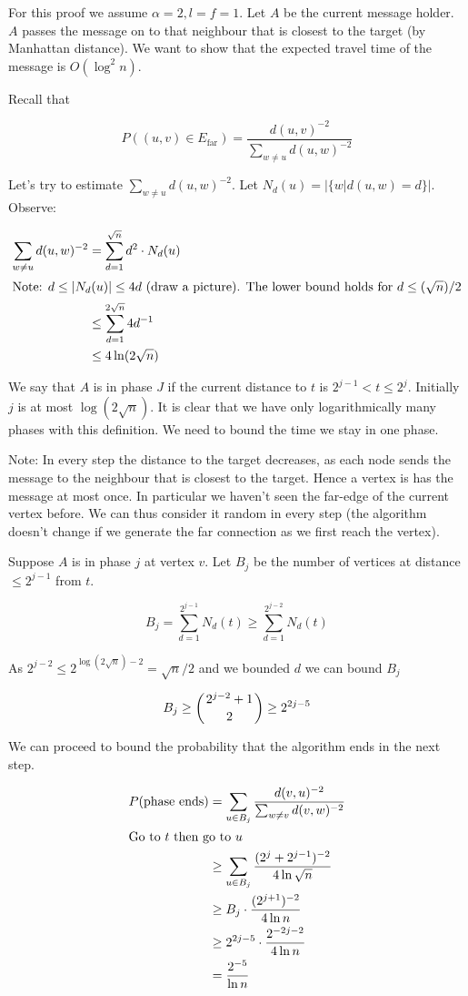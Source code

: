 \begin{pr} For this proof we assume $\alpha=2,l=f=1$. Let $A$ be the current message holder. $A$ passes the message on to that neighbour that is closest to the target (by Manhattan distance). We want to show that the expected travel time of the message is $O(\log^2n)$.

Recall that 

\[P((u,v)\in E_{\text{far}}) = \frac{d(u,v)^{-2}}{\sum_{w\neq u}d(u,w)^{-2}}\]

Let's try to estimate $\sum_{w\neq u}d(u,w)^{-2}$. Let $N_d(u) = |\{w|d(u,w)=d\}|$. Observe:

\begin{align*}
\sum_{w\neq u}d(u,w)^{-2} &= \sum_{d=1}^{\sqrt n} d^2\cdot N_d(u)\\
\intertext{Note: $d\leq |N_d(u)|\leq 4d$ (draw a picture). The lower bound holds for $d\leq (\sqrt n) /2$}
	&\leq \sum_{d=1}^{2\sqrt n} 4 d^{-1}\\
	&\leq 4 \ln(2\sqrt{n})
\end{align*}

We say that $A$ is in phase $J$ if the current distance to $t$ is $2^{j-1} < t \leq 2^j$. Initially $j$ is at most $\log (2\sqrt n)$. It is clear that we have only logarithmically many phases with this definition. We need to bound the time we stay in one phase.

Note: In every step the distance to the target decreases, as each node sends the message to the neighbour that is closest to the target. Hence a vertex is has the message at most once. In particular we haven't seen the far-edge of the current vertex before. We can thus consider it random in every step (the algorithm doesn't change if we generate the far connection as we first reach the vertex).

Suppose $A$ is in phase $j$ at vertex $v$. Let $B_j$ be the number of vertices at distance $\leq 2^{j-1}$ from $t$. 

\[B_j = \sum_{d=1}^{2^{j-1}} N_d(t)\geq \sum_{d=1}^{2^{j-2}} N_d(t)\]

As $2^{j-2} \leq 2^{\log(2\sqrt{n})-2} = \sqrt{n}/2$ and we bounded $d$ we can bound $B_j$

\[B_j \geq \left( {2^{j-2}+1} \atop 2 \right) \geq 2^{2j-5}\]

We can proceed to bound the probability that the algorithm ends in the next step.

\begin{align*}
P(\text{phase ends}) &= \sum_{u\in B_j} \frac{d(v,u)^{-2}}{\sum_{w\neq v} d(v,w)^{-2}}\\
\intertext{Go to $t$ then go to $u$}
&\geq \sum_{u\in B_j} \frac{(2^j+2^{j-1})^{-2}}{4\ln \sqrt{n}}\\
&\geq B_j \cdot \frac{(2^{j+1})^{-2}}{4\ln n}\\
&\geq 2^{2j-5} \cdot \frac{2^{-2j-2}}{4\ln n}\\
&=\frac{2^{-5}}{\ln n}
\end{align*}


\end{pr}
